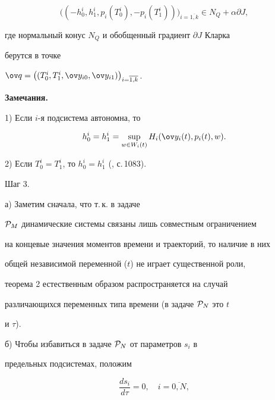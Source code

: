 \begin{thm}
\begin{itemize}
$$


\big((-h_0^i,h_1^i,p_i(T_0^i),-p_i(T_1^i))\big)_{i=\overline{1,k}}


\in N_Q+\alpha\partial J,


$$


где нормальный конус $N_Q$ и обобщенный градиент $\partial J$ Кларка


берутся в точке


$\ov q=\big((T_0^i,T_1^i,\ov y_{i0},\ov


y_{i1})\big)_{i=\overline{1,k}}$.


\end{itemize}


\end{thm}





{\bf Замечания.}


1) Если $i$-я подсистема автономна, то


$$


h_0^i=h_1^i=\sup_{w\in W_i(t)}H_i(\ov y_i(t),p_i(t),w).


$$





2) Если $T_0^i=T_1^i$, то $h_0^i=h_1^i$ (\cite{K.B.}, с.\,1083).


\medskip





Шаг 3.


а) Заметим сначала, что т.\,к. в задаче


${\cal P}_M$ динамические системы связаны лишь совместным ограничением


на концевые значения моментов времени и траекторий, то наличие в них


общей независимой переменной ($t$) не играет существенной роли,


теорема 2 естественным образом распространяется на случай


различающихся переменных типа времени (в задаче ${\cal P}_N$ это $t$


и $\tau$).


\smallskip





б) Чтобы избавиться в задаче ${\cal P}_N$ от параметров $s_i$ в


предельных подсистемах, положим


\begin{equation}


\frac{ds_i}{d\tau}=0,\quad


i=\overline{0,N}, \label{ggl13}


\end{equation}


